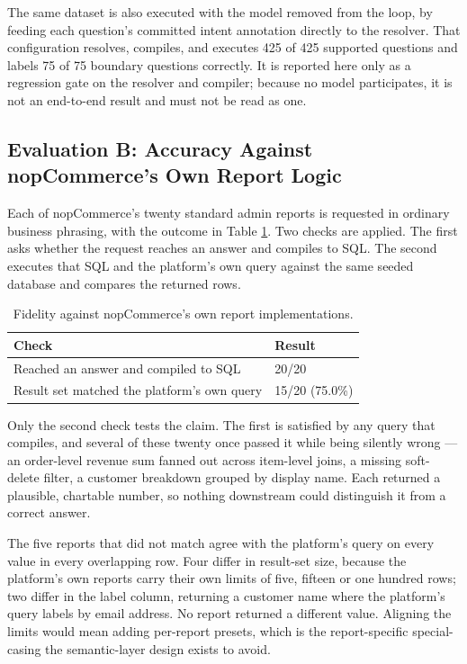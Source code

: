 \documentclass[pdflatex,sn-mathphys-num]{sn-jnl}
\begin{document}
The same dataset is also executed with the model removed from the loop, by feeding each question's committed intent annotation directly to the resolver. That configuration resolves, compiles, and executes 425 of 425 supported questions and labels 75 of 75 boundary questions correctly. It is reported here only as a regression gate on the resolver and compiler; because no model participates, it is not an end-to-end result and must not be read as one.


\subsection{Evaluation B: Accuracy Against nopCommerce's Own Report Logic}

Each of nopCommerce's twenty standard admin reports is requested in ordinary business phrasing, with the outcome in Table \ref{tab:5}. Two checks are applied. The first asks whether the request reaches an answer and compiles to SQL. The second executes that SQL and the platform's own query against the same seeded database and compares the returned rows.


\begin{table}[t]
\caption{Fidelity against nopCommerce's own report implementations.}
\label{tab:5}
\centering
\renewcommand{\arraystretch}{1.15}
\begin{tabular}{ll}
\toprule
Check & Result \\
\midrule
Reached an answer and compiled to SQL & 20/20 \\
Result set matched the platform's own query & 15/20 (75.0\%) \\
\bottomrule
\end{tabular}
\end{table}

Only the second check tests the claim. The first is satisfied by any query that compiles, and several of these twenty once passed it while being silently wrong — an order-level revenue sum fanned out across item-level joins, a missing soft-delete filter, a customer breakdown grouped by display name. Each returned a plausible, chartable number, so nothing downstream could distinguish it from a correct answer.


The five reports that did not match agree with the platform's query on every value in every overlapping row. Four differ in result-set size, because the platform's own reports carry their own limits of five, fifteen or one hundred rows; two differ in the label column, returning a customer name where the platform's query labels by email address. No report returned a different value. Aligning the limits would mean adding per-report presets, which is the report-specific special-casing the semantic-layer design exists to avoid.
\end{document}
